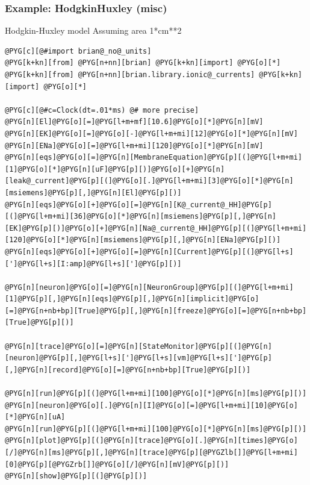 \documentclass[letterpaper,10pt,english]{manual}
\begin{document}
\resetcurrentobjects
\hypertarget{--doc-examples-misc_HodgkinHuxley}{}

\hypertarget{index-35}{}\subsubsection{Example: HodgkinHuxley (misc)}

Hodgkin-Huxley model
Assuming area 1*cm**2

\begin{Verbatim}[commandchars=@\[\]]
@PYG[c][@#import brian@_no@_units]
@PYG[k+kn][from] @PYG[n+nn][brian] @PYG[k+kn][import] @PYG[o][*]
@PYG[k+kn][from] @PYG[n+nn][brian.library.ionic@_currents] @PYG[k+kn][import] @PYG[o][*]

@PYG[c][@#c=Clock(dt=.01*ms) @# more precise]
@PYG[n][El]@PYG[o][=]@PYG[l+m+mf][10.6]@PYG[o][*]@PYG[n][mV]
@PYG[n][EK]@PYG[o][=]@PYG[o][-]@PYG[l+m+mi][12]@PYG[o][*]@PYG[n][mV]
@PYG[n][ENa]@PYG[o][=]@PYG[l+m+mi][120]@PYG[o][*]@PYG[n][mV]
@PYG[n][eqs]@PYG[o][=]@PYG[n][MembraneEquation]@PYG[p][(]@PYG[l+m+mi][1]@PYG[o][*]@PYG[n][uF]@PYG[p][)]@PYG[o][+]@PYG[n][leak@_current]@PYG[p][(]@PYG[o][.]@PYG[l+m+mi][3]@PYG[o][*]@PYG[n][msiemens]@PYG[p][,]@PYG[n][El]@PYG[p][)]
@PYG[n][eqs]@PYG[o][+]@PYG[o][=]@PYG[n][K@_current@_HH]@PYG[p][(]@PYG[l+m+mi][36]@PYG[o][*]@PYG[n][msiemens]@PYG[p][,]@PYG[n][EK]@PYG[p][)]@PYG[o][+]@PYG[n][Na@_current@_HH]@PYG[p][(]@PYG[l+m+mi][120]@PYG[o][*]@PYG[n][msiemens]@PYG[p][,]@PYG[n][ENa]@PYG[p][)]
@PYG[n][eqs]@PYG[o][+]@PYG[o][=]@PYG[n][Current]@PYG[p][(]@PYG[l+s][']@PYG[l+s][I:amp]@PYG[l+s][']@PYG[p][)]

@PYG[n][neuron]@PYG[o][=]@PYG[n][NeuronGroup]@PYG[p][(]@PYG[l+m+mi][1]@PYG[p][,]@PYG[n][eqs]@PYG[p][,]@PYG[n][implicit]@PYG[o][=]@PYG[n+nb+bp][True]@PYG[p][,]@PYG[n][freeze]@PYG[o][=]@PYG[n+nb+bp][True]@PYG[p][)]

@PYG[n][trace]@PYG[o][=]@PYG[n][StateMonitor]@PYG[p][(]@PYG[n][neuron]@PYG[p][,]@PYG[l+s][']@PYG[l+s][vm]@PYG[l+s][']@PYG[p][,]@PYG[n][record]@PYG[o][=]@PYG[n+nb+bp][True]@PYG[p][)]

@PYG[n][run]@PYG[p][(]@PYG[l+m+mi][100]@PYG[o][*]@PYG[n][ms]@PYG[p][)]
@PYG[n][neuron]@PYG[o][.]@PYG[n][I]@PYG[o][=]@PYG[l+m+mi][10]@PYG[o][*]@PYG[n][uA]
@PYG[n][run]@PYG[p][(]@PYG[l+m+mi][100]@PYG[o][*]@PYG[n][ms]@PYG[p][)]
@PYG[n][plot]@PYG[p][(]@PYG[n][trace]@PYG[o][.]@PYG[n][times]@PYG[o][/]@PYG[n][ms]@PYG[p][,]@PYG[n][trace]@PYG[p][@PYGZlb[]]@PYG[l+m+mi][0]@PYG[p][@PYGZrb[]]@PYG[o][/]@PYG[n][mV]@PYG[p][)]
@PYG[n][show]@PYG[p][(]@PYG[p][)]
\end{Verbatim}
\end{document}
